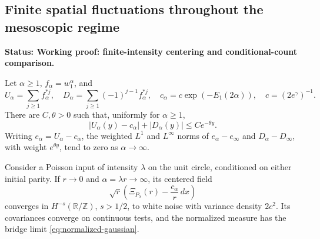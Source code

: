 \documentclass[11pt,letterpaper]{article}
\newcommand{\T}{\mathbb R/\mathbb Z}\newcommand{\Leb}{\operatorname{Leb}}
\newcommand{\status}[1]{\textbf{Status: #1.}}
\begin{document}
\subsection{Finite spatial fluctuations throughout the mesoscopic regime}
\label{sec:full-finite-spatial-CLT}

\status{Working proof: finite-intensity centering and conditional-count comparison}

\begin{lemma}
\label{lem:finite-Poisson-spatial-CLT}
Let $\alpha\ge1$, $f_\alpha=w_1^\alpha$, and
\[
 U_\alpha=\sum_{j\ge1}f_\alpha^{*j},\quad
 D_\alpha=\sum_{j\ge1}(-1)^{j-1}f_\alpha^{*j},\quad
 c_\alpha=c\exp(-E_1(2\alpha)),\quad c=(2e^\gamma)^{-1}.
\]
There are $C,\theta>0$ such that, uniformly for $\alpha\ge1$,
\begin{equation}\label{eq:uniform-renewal-excess}
 |U_\alpha(y)-c_\alpha|+|D_\alpha(y)|\le Ce^{-\theta y}.
\end{equation}
Writing $e_\alpha=U_\alpha-c_\alpha$, the weighted $L^1$ and
$L^\infty$ norms of $e_\alpha-e_\infty$ and
$D_\alpha-D_\infty$, with weight $e^{\theta y}$, tend to zero
as $\alpha\to\infty$.

Consider a Poisson input of intensity $\lambda$ on the unit circle,
conditioned on either initial parity. If $r\to0$ and
$\alpha=\lambda r\to\infty$, its centered field
\begin{equation}\label{eq:finite-Poisson-Gaussian-field}
 \sqrt r\left(\Xi_{P_\lambda}(r)-\frac{c_\alpha}{r}\,dx\right)
\end{equation}
converges in $H^{-s}(\T)$, $s>1/2$, to white noise with variance
density $2c^2$. Its covariances converge on continuous tests,
and the normalized measure has the bridge limit
\eqref{eq:normalized-gaussian}.
\end{lemma}
\end{document}
